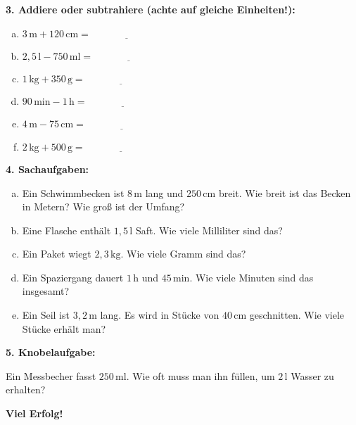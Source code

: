 \vspace{0.5em}

\textbf{3. Addiere oder subtrahiere (achte auf gleiche Einheiten!):}
\begin{multicols}{2}
\begin{enumerate}[a)]
    \item $3\,\mathrm{m} + 120\,\mathrm{cm} = \underline{\hspace{3cm}}$
    \item $2{,}5\,\mathrm{l} - 750\,\mathrm{ml} = \underline{\hspace{3cm}}$
    \item $1\,\mathrm{kg} + 350\,\mathrm{g} = \underline{\hspace{3cm}}$
    \item $90\,\mathrm{min} - 1\,\mathrm{h} = \underline{\hspace{3cm}}$
    \item $4\,\mathrm{m} - 75\,\mathrm{cm} = \underline{\hspace{3cm}}$
    \item $2\,\mathrm{kg} + 500\,\mathrm{g} = \underline{\hspace{3cm}}$
\end{enumerate}
\end{multicols}

\vspace{0.5em}

\textbf{4. Sachaufgaben:}
\begin{enumerate}[a)]
    \item Ein Schwimmbecken ist $8\,\mathrm{m}$ lang und $250\,\mathrm{cm}$ breit. Wie breit ist das Becken in Metern? Wie groß ist der Umfang?
    \item Eine Flasche enthält $1{,}5\,\mathrm{l}$ Saft. Wie viele Milliliter sind das?
    \item Ein Paket wiegt $2{,}3\,\mathrm{kg}$. Wie viele Gramm sind das?
    \item Ein Spaziergang dauert $1\,\mathrm{h}$ und $45\,\mathrm{min}$. Wie viele Minuten sind das insgesamt?
    \item Ein Seil ist $3{,}2\,\mathrm{m}$ lang. Es wird in Stücke von $40\,\mathrm{cm}$ geschnitten. Wie viele Stücke erhält man?
\end{enumerate}

\vspace{0.5em}

\textbf{5. Knobelaufgabe:}

Ein Messbecher fasst $250\,\mathrm{ml}$. Wie oft muss man ihn füllen, um $2\,\mathrm{l}$ Wasser zu erhalten?

\textbf{Viel Erfolg!}